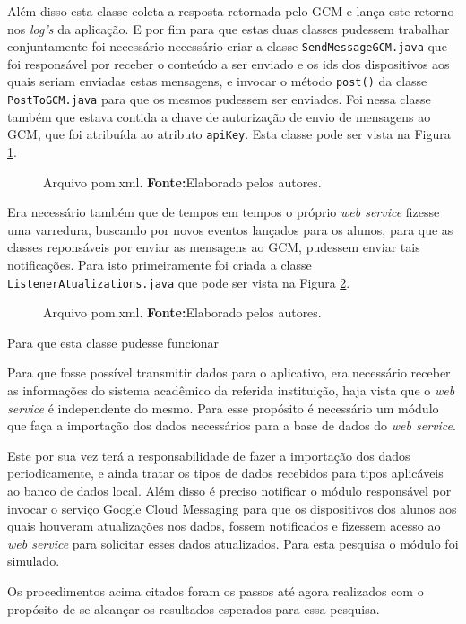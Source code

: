 	\pagebreak
	
	\par Além disso esta classe coleta a resposta retornada pelo GCM e lança este
retorno nos \textit{log's} da aplicação. E por fim para que estas duas classes
pudessem trabalhar conjuntamente foi necessário necessário criar a classe
\texttt{SendMessageGCM.java} que foi responsável por receber o conteúdo a ser
enviado e os ids dos dispositivos aos quais seriam enviadas estas mensagens, e
invocar o método \texttt{post()} da classe \texttt{PostToGCM.java} para que os
mesmos pudessem ser enviados. Foi nessa classe também que estava contida a
chave de autorização de envio de mensagens ao GCM, que foi atribuída ao
atributo \texttt{apiKey}. Esta classe pode ser vista na Figura
\ref{fig:desws32}.

	\begin{figure}[h!]
		
		\caption[Arquivo \texttt{pom.xml}]{Arquivo pom.xml.
		\textbf{Fonte:}Elaborado pelos autores.}
		\label{fig:desws32}
	\end{figure}
		
	\par Era necessário também que  de tempos em tempos o próprio \textit{web
service} fizesse uma varredura, buscando por novos eventos lançados para os
alunos, para que as classes reponsáveis por enviar as mensagens ao GCM, pudessem
enviar tais notificações. Para isto primeiramente foi criada a classe
\texttt{ListenerAtualizations.java} que pode ser vista na Figura
\ref{fig:desws33}.

	\begin{figure}[h!]
		
		\caption[Arquivo \texttt{pom.xml}]{Arquivo pom.xml.
		\textbf{Fonte:}Elaborado pelos autores.}
		\label{fig:desws33}
	\end{figure}

	\par Para que esta classe pudesse funcionar

	\par Para que fosse possível transmitir dados para o aplicativo, era
necessário receber as informações do sistema acadêmico da referida instituição,
haja vista que o \textit{web service} é independente do mesmo. Para esse
propósito é necessário um módulo que faça a importação dos dados necessários
para a base de dados do \textit{web service}.

	\par Este por sua vez terá a responsabilidade de fazer a importação dos dados
periodicamente, e ainda tratar os tipos de dados recebidos para tipos
aplicáveis ao banco de dados local. Além disso é preciso notificar o módulo
responsável por invocar o serviço Google Cloud Messaging para que os
dispositivos dos alunos aos quais houveram atualizações nos dados, fossem
notificados e fizessem acesso ao \textit{web service} para solicitar esses
dados atualizados. Para esta pesquisa o módulo foi simulado.

	\par Os procedimentos acima citados foram os passos até agora realizados com o
propósito de se alcançar os resultados esperados para essa pesquisa.

